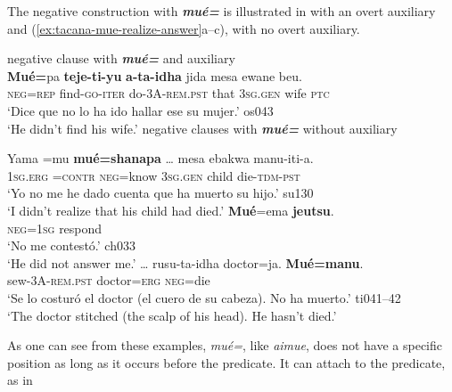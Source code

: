 \documentclass[output=paper]{langsci/langscibook}
\begin{document}
The negative construction with \textbf{\textit{mué=}} is illustrated in
 with an overt auxiliary and
(\ref{ex:tacana-mue-realize-answer}a--c), with no overt auxiliary.
%
\begin{exe}\ex \label{ex:tacana-mueaux}  negative clause with
\textbf{\textit{mué=}} and auxiliary\\
\gll  \textbf{Mué=}pa
\textbf{teje-ti-yu}
\textbf{a-ta-idha}
\makebox[0pt][l]{\raisebox{\baselineskip}{O}}{\ob}jida mesa ewane{\cb} beu.\\
  \textsc{neg=rep}  find-\textsc{go-iter}  do\textsc{-3A-rem.pst}  that
  \textsc{3sg.gen}  wife  \textsc{ptc}\\
\glt `Dice que no lo ha ido hallar ese su mujer.' os043\\
`He didn't find his wife.'
\ex \label{ex:tacana-mue-realize-answer} negative clauses with
\textbf{\textit{mué=}} without auxiliary
\begin{xlist}
\ex\label{}
\gll  {}Yama  =mu
\textbf{mué=shanapa}
\ob\ldots{\cb} {\ob}mesa ebakwa{\cb} manu-iti-a.\\
\textsc{1sg.erg}  \textsc{=contr}  \textsc{neg}=know {} 3\textsc{sg.gen}
child die-\textsc{tdm-pst}\\
\glt `Yo no me he dado cuenta que ha muerto su hijo.' su130\\
`I didn't realize that his child had died.'
\ex\label{ex:tacana-mue-answer}
\gll {}\textbf{Mué}=ema
\textbf{jeutsu}.\\
    \textsc{neg=1sg} respond\\
\glt `No me contestó.' ch033\\
`He did not answer me.'
\ex\label{ex:tacana-mue-doctor}
\gll  \ldots{} rusu-ta-idha doctor=ja.
\textbf{Mué=manu}.\\
{}    sew-3A\textsc{-rem.pst}  doctor=\textsc{erg}  \textsc{neg}=die\\
\glt `Se lo costuró el doctor (el cuero de su cabeza). No ha muerto.'
ti041--42\\
`The doctor stitched (the scalp of his head). He hasn't died.'
\end{xlist}\end{exe}
%
As one can see from these examples, \textit{mué=}, like \textit{aimue},
does not have a specific position as long as it occurs before the
predicate. It can attach to the predicate, as in
\end{document}
